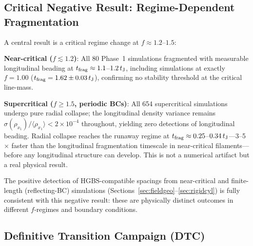 \documentclass[twoside,twocolumn]{mnras}
\begin{document}
\subsection{Critical Negative Result: Regime-Dependent Fragmentation}
\label{sec:critnat}

A central result is a critical regime change at $f \approx 1.2$--$1.5$:

\textbf{Near-critical ($f \lesssim 1.2$)}: All 80 Phase~1 simulations fragmented with
measurable longitudinal beading at $t_{\rm frag} \approx 1.1$--$1.2\,t_{\rm J}$,
including simulations at exactly $f = 1.00$ ($t_{\rm frag} = 1.62 \pm 0.03\,t_{\rm J}$),
confirming no stability threshold at the critical line-mass.

\textbf{Supercritical ($f \geq 1.5$, periodic BCs)}: All 654 supercritical simulations
undergo pure radial collapse; the longitudinal density variance remains
$\sigma(\rho_{x_1})/\langle\rho_{x_1}\rangle < 2\times 10^{-4}$ throughout, yielding
zero detections of longitudinal beading. Radial collapse reaches the runaway regime
at $t_{\rm frag} \approx 0.25$--$0.34\,t_{\rm J}$---3--5$\times$ faster than the
longitudinal fragmentation timescale in near-critical filaments---before any longitudinal
structure can develop. This is not a numerical artifact but a real physical result.

The positive detection of HGBS-compatible spacings from near-critical and finite-length
(reflecting-BC) simulations (Sections~\ref{sec:fieldgeo}--\ref{sec:rigidcyl}) is fully
consistent with this negative result: these are physically distinct outcomes in
different $f$-regimes and boundary conditions.

\subsection{Definitive Transition Campaign (DTC)}
\label{sec:dtc}
\end{document}
